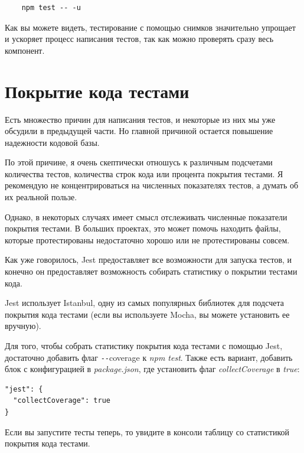 \begin{lstlisting}
	npm test -- -u
\end{lstlisting}

Как вы можете видеть, тестирование с помощью снимков значительно упрощает и ускоряет процесс написания тестов, так как можно проверять сразу весь компонент.


\section{Покрытие кода тестами}

Есть множество причин для написания тестов, и некоторые из них мы уже обсудили в предыдущей части. Но главной причиной остается повышение надежности кодовой базы.

По этой причине, я очень скептически отношусь к различным подсчетами количества тестов, количества строк кода или процента покрытия тестами. Я рекомендую не концентрироваться на численных показателях тестов, а думать об их реальной пользе.

Однако, в некоторых случаях имеет смысл отслеживать численные показатели покрытия тестами. В больших проектах, это может помочь находить файлы, которые протестированы недостаточно хорошо или не протестированы совсем.

Как уже говорилось, Jest предоставляет все возможности для запуска тестов, и конечно он предоставляет возможность собирать статистику о покрытии тестами кода.

Jest использует Istanbul, одну из самых популярных библиотек для подсчета покрытия кода тестами (если вы используете Mocha, вы можете установить ее вручную).

Для того, чтобы собрать статистику покрытия кода тестами с помощью Jest, достаточно добавить флаг \texttt{-{}-}coverage к \textit{npm test}. Также есть вариант, добавить блок с конфигурацией в \textit{package.json}, где установить флаг \textit{collectCoverage} в \textit{true}:

\begin{lstlisting}
"jest": {
  "collectCoverage": true
}
\end{lstlisting}

Если вы запустите тесты теперь, то увидите в консоли таблицу со статистикой покрытия кода тестами.

\begin{center}
\end{center}

